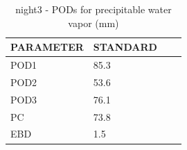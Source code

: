 \begin{table}[p!]
\begin{center}
\begin{tabular}{|l|l|l|l|}
\hline
\multicolumn{1}{|c|}{\cellcolor[HTML]{C0C0C0}\textbf{PARAMETER}} & \multicolumn{1}{c|}{\cellcolor[HTML]{C0C0C0}\textbf{STANDARD}} \\
\hline
\cellcolor[HTML]{C0C0C0}POD1  & 85.3                                \\
\cellcolor[HTML]{C0C0C0}POD2  & 53.6                                \\
\cellcolor[HTML]{C0C0C0}POD3  & 76.1                                \\
\cellcolor[HTML]{C0C0C0}PC    & 73.8                                  \\
\cellcolor[HTML]{C0C0C0}EBD   & 1.5                                 \\
\hline
\end{tabular}
\caption{night3 - PODs for precipitable water vapor (mm)}
\label{tab:podpwv:night3}
\end{center}
\end{table}
